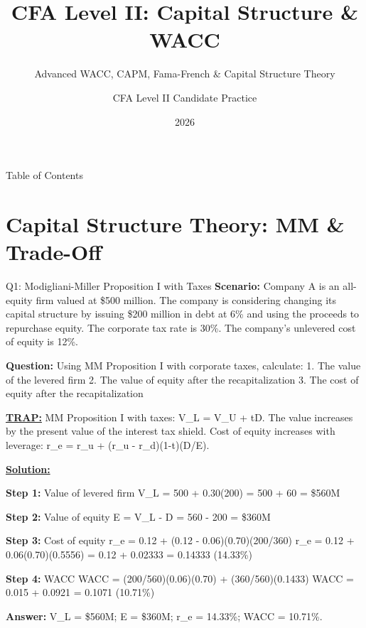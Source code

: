 \documentclass{beamer}
\title{CFA Level II: Capital Structure \& WACC}
\subtitle{Advanced WACC, CAPM, Fama-French \& Capital Structure Theory}
\author{CFA Level II Candidate Practice}
\date{2026}
\renewcommand{\scriptsize}{\fontsize{6pt}{7pt}\selectfont}
\renewcommand{\footnotesize}{\fontsize{7pt}{8pt}\selectfont}
\begin{document}
	
	\begin{frame}
		\titlepage
	\end{frame}
	
	\begin{frame}{Table of Contents}
		\footnotesize
		\tableofcontents
	\end{frame}
	
	
	\section{Capital Structure Theory: MM \& Trade-Off}
	
	\begin{frame}{Q1: Modigliani-Miller Proposition I with Taxes}
		\scriptsize
		\textbf{Scenario:} Company A is an all-equity firm valued at \$500 million. The company is considering changing its capital structure by issuing \$200 million in debt at 6\% and using the proceeds to repurchase equity. The corporate tax rate is 30\%. The company's unlevered cost of equity is 12\%.
		
		\textbf{Question:} Using MM Proposition I with corporate taxes, calculate:
		1. The value of the levered firm
		2. The value of equity after the recapitalization
		3. The cost of equity after the recapitalization
		
		\vspace{2pt}
		\underline{\textbf{TRAP:}} MM Proposition I with taxes: V\_L = V\_U + tD. The value increases by the present value of the interest tax shield. Cost of equity increases with leverage: r\_e = r\_u + (r\_u - r\_d)(1-t)(D/E).
		
		\vspace{4pt}
		\underline{\textbf{Solution:}}
		
		\textbf{Step 1:} Value of levered firm
		V\_L = 500 + 0.30(200) = 500 + 60 = \$560M
		
		\textbf{Step 2:} Value of equity
		E = V\_L - D = 560 - 200 = \$360M
		
		\textbf{Step 3:} Cost of equity
		r\_e = 0.12 + (0.12 - 0.06)(0.70)(200/360)
		r\_e = 0.12 + 0.06(0.70)(0.5556) = 0.12 + 0.02333 = 0.14333 (14.33\%)
		
		\textbf{Step 4:} WACC
		WACC = (200/560)(0.06)(0.70) + (360/560)(0.1433)
		WACC = 0.015 + 0.0921 = 0.1071 (10.71\%)
		
		\textbf{Answer:} V\_L = \$560M; E = \$360M; r\_e = 14.33\%; WACC = 10.71\%.
	\end{frame}
	
\end{document}
